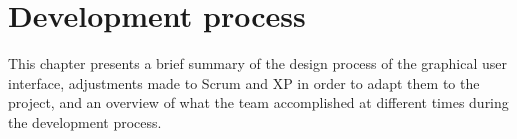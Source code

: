\chapter{Development process}
\label{sec:devProcess}
This chapter presents a brief summary of the design process of the graphical user interface, adjustments made to Scrum and XP in order to adapt them to the project, and an overview of what the team accomplished at different times during the development process. 




